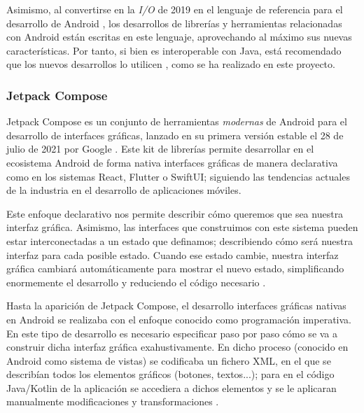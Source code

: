             Asimismo, al convertirse en la \textit{I/O} de 2019 en el lenguaje de referencia para el desarrollo 
            de Android \cite{braun_celebrating_2022}, los desarrollos de librerías y herramientas relacionadas con 
            Android están escritas en este lenguaje, aprovechando al máximo sus nuevas características. Por tanto, si
            bien es interoperable con Java, está recomendado que los nuevos desarrollos lo utilicen 
            \cite{lardinois_kotlin_2019}, como se ha realizado en este proyecto.
            

        \subsubsection{Jetpack Compose}

            Jetpack Compose es un conjunto de herramientas \textit{modernas} de Android para el desarrollo de 
            interfaces gráficas, lanzado en su primera versión estable el 28 de julio de 2021 por Google
            \cite{bellini_jetpack_2021}. Este kit de librerías permite desarrollar en el ecosistema Android de 
            forma nativa interfaces gráficas de manera declarativa como en los sistemas React, Flutter o SwiftUI;
            siguiendo las tendencias actuales de la industria en el desarrollo de aplicaciones móviles. \newline

            Este enfoque declarativo nos permite describir cómo queremos que sea nuestra interfaz gráfica. 
            Asimismo, las interfaces que construimos con este sistema pueden estar interconectadas a un estado 
            que definamos; describiendo cómo será nuestra interfaz para cada posible estado. Cuando ese estado cambie, 
            nuestra interfaz gráfica cambiará automáticamente para mostrar el nuevo estado, simplificando enormemente 
            el desarrollo y reduciendo el código necesario \cite{leiva_que_2021}. \newline

            Hasta la aparición de Jetpack Compose, el desarrollo interfaces gráficas nativas en Android se realizaba 
            con el enfoque conocido como programación imperativa. En este tipo de desarrollo es necesario especificar 
            paso por paso cómo se va a construir dicha interfaz gráfica exahustivamente. En dicho proceso (conocido 
            en Android como sistema de vistas) se codificaba un fichero XML, en el que se describían todos los 
            elementos gráficos (botones, textos...); para en el código Java/Kotlin de la aplicación se accediera 
            a dichos elementos y se le aplicaran manualmente modificaciones y transformaciones 
            \cite{noauthor_programacion_2021}. \newline

